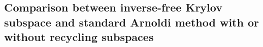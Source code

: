 %        
% 
%
%

\subsection{Comparison between inverse-free Krylov subspace and standard Arnoldi method with or without recycling subspaces}

